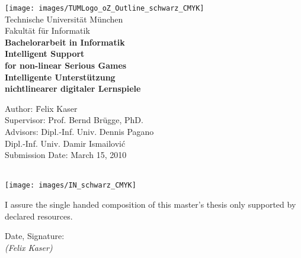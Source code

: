 \begin{center}
  \texttt{[image: images/TUMLogo\_oZ\_Outline\_schwarz\_CMYK]}\\              \vspace{.2cm}
  {\Large \sc Technische Universität München}\\                 \vspace{.2cm}
  {\huge \sc Fakultät für Informatik\\[1mm]}                    \vspace{1cm}
  {\Large \textbf{Bachelorarbeit in Informatik}}\\              \vspace{1cm}
  {\huge \textbf{Intelligent Support}}\\         \vspace*{3mm}
  {\huge \textbf{for non-linear Serious Games}}\\                       \vspace{1cm}
  {\huge \textbf{Intelligente Unterstützung}}\\   \vspace*{3mm}
  {\huge \textbf{nichtlinearer digitaler Lernspiele}}\\                     \vspace*{3mm}
    
  \parbox{1cm}{
  \begin{large}
  \begin{tabbing}
    Author: \hspace{2cm} \=Felix Kaser\\
    Supervisor: \>Prof. Bernd Brügge, PhD.\\
    Advisors: \>Dipl.-Inf. Univ. Dennis Pagano\\
    \>Dipl.-Inf. Univ. Damir Ismailović\\[1mm]
    Submission Date: \> March 15, 2010\\
  \end{tabbing}
  \end{large}
  }\\ %
  \texttt{[image: images/IN\_schwarz\_CMYK]}
\end{center}
\newpage
\thispagestyle{empty}
\cleardoublepage
\thispagestyle{empty}
\begin{large}
\vspace*{13cm}
\noindent
I assure the single handed composition of this master's thesis only supported by declared resources.

\vspace{3cm}
\hspace*{3cm}%
Date, Signature: \dotfill
\\
\hspace*{9.5cm}%
\textit{(Felix Kaser)}
\end{large}
